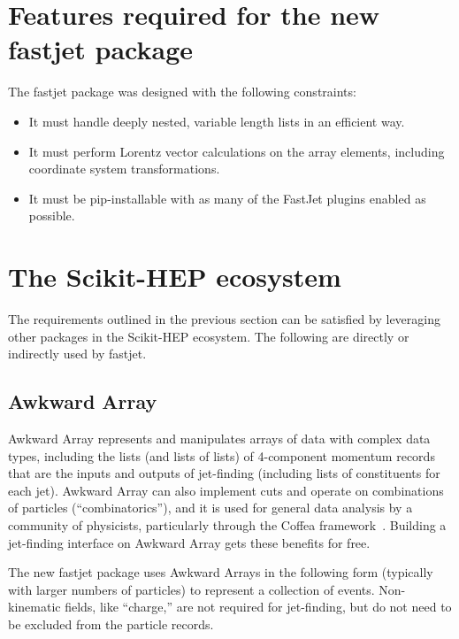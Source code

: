 \documentclass[a4paper]{jpconf}
\begin{document}
\section{Features required for the new fastjet package}

The fastjet package was designed with the following constraints:

\begin{itemize}
  \item It must handle deeply nested, variable length lists in an efficient way.
  \item It must perform Lorentz vector calculations on the array elements, including coordinate system transformations.
  \item It must be pip-installable with as many of the FastJet plugins enabled as possible.
\end{itemize}

\section{The Scikit-HEP ecosystem}

The requirements outlined in the previous section can be satisfied by leveraging other packages in the Scikit-HEP ecosystem. The following are directly or indirectly used by fastjet.

\subsection{Awkward Array}

Awkward Array represents and manipulates arrays of data with complex data types, including the lists (and lists of lists) of 4-component momentum records that are the inputs and outputs of jet-finding (including lists of constituents for each jet). Awkward Array can also implement cuts and operate on combinations of particles (``combinatorics''), and it is used for general data analysis by a community of physicists, particularly through the Coffea framework~\cite{lindsey_gray_2021_5762406}. Building a jet-finding interface on Awkward Array gets these benefits for free.

The new fastjet package uses Awkward Arrays in the following form (typically with larger numbers of particles) to represent a collection of events. Non-kinematic fields, like ``charge,'' are not required for jet-finding, but do not need to be excluded from the particle records.
\end{document}
